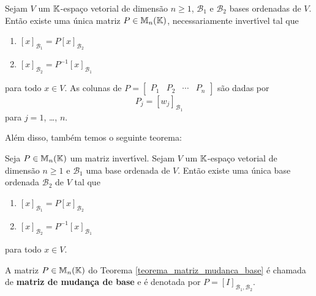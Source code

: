\begin{teorema}\label{teorema_mudanca_base}
  Sejam $V$ um $\mathbb{K}$-espa\c{c}o vetorial de dimens\~ao $n \ge 1$, $\mathcal{B}_1$ e $\mathcal{B}_2$ bases ordenadas de $V$. Ent\~ao existe uma \'unica matriz $P \in \mathbb{M}_n(\mathbb{K})$, necessariamente invert{\'\i}vel tal que
  \begin{enumerate}[label={\roman*})]
    \item $[x]_{\mathcal{B}_1} = P[x]_{\mathcal{B}_2}$
    \item $[x]_{\mathcal{B}_2} = P^{-1}[x]_{\mathcal{B}_1}$
  \end{enumerate}
  para todo $x \in V$. As colunas de $P = \begin{bmatrix}
    P_1 & P_2 & \cdots & P_n
  \end{bmatrix}$ s\~ao dadas por
  \[
    P_j = [w_j]_{\mathcal{B}_1}
  \]
  para $j = 1$, \dots, $n$.
\end{teorema}

Al\'em disso, tamb\'em temos o seguinte teorema:

\begin{teorema}\label{teorema_matriz_mudanca_base}
  Seja $P \in \mathbb{M}_n(\mathbb{K})$ um matriz invert{\'\i}vel. Sejam $V$ um $\mathbb{K}$-espa\c{c}o vetorial de dimens\~ao $n \ge 1$ e $\mathcal{B}_1$ uma base ordenada de $V$. Ent\~ao existe uma \'unica base ordenada $\mathcal{B}_2$ de $V$ tal que
  \begin{enumerate}[label={\roman*})]
    \item $[x]_{\mathcal{B}_1} = P[x]_{\mathcal{B}_2}$
    \item $[x]_{\mathcal{B}_2} = P^{-1}[x]_{\mathcal{B}_1}$
  \end{enumerate}
  para todo $x \in V$.
\end{teorema}

\begin{definicao}
  A matriz $P \in \mathbb{M}_n(\mathbb{K})$ do Teorema \ref{teorema_matriz_mudanca_base} \'e chamada de \textbf{matriz de mudan\c{c}a de base} e \'e denotada por $P = [I]_{{\mathcal{B}_1},{\mathcal{B}_2}}$.
\end{definicao}

